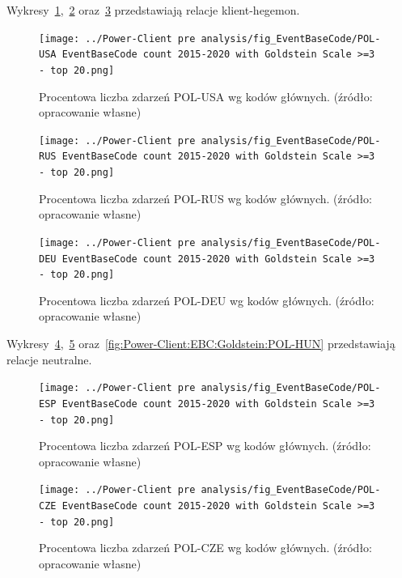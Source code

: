 \documentclass[11pt]{report}
\begin{document}
    Wykresy~\ref{fig:Power-Client:EBC:Goldstein:POL-USA},~\ref{fig:Power-Client:EBC:Goldstein:POL-RUS} oraz~\ref{fig:Power-Client:EBC:Goldstein:POL-DEU} przedstawiają relacje klient-hegemon.
    \begin{figure}[!htp]
        \centering
        \texttt{[image: ../Power-Client pre analysis/fig\_EventBaseCode/POL-USA EventBaseCode count 2015-2020 with Goldstein Scale >=3 - top 20.png]}
        \caption{Procentowa liczba zdarzeń POL-USA wg kodów głównych. (źródło: opracowanie własne)}
        \label{fig:Power-Client:EBC:Goldstein:POL-USA}
    \end{figure}

    \begin{figure}[!htp]
        \centering
        \texttt{[image: ../Power-Client pre analysis/fig\_EventBaseCode/POL-RUS EventBaseCode count 2015-2020 with Goldstein Scale >=3 - top 20.png]}
        \caption{Procentowa liczba zdarzeń POL-RUS wg kodów głównych. (źródło: opracowanie własne)}
        \label{fig:Power-Client:EBC:Goldstein:POL-RUS}
    \end{figure}

    \begin{figure}[!htp]
        \centering
        \texttt{[image: ../Power-Client pre analysis/fig\_EventBaseCode/POL-DEU EventBaseCode count 2015-2020 with Goldstein Scale >=3 - top 20.png]}
        \caption{Procentowa liczba zdarzeń POL-DEU wg kodów głównych. (źródło: opracowanie własne)}
        \label{fig:Power-Client:EBC:Goldstein:POL-DEU}
    \end{figure}

    Wykresy~\ref{fig:Power-Client:EBC:Goldstein:POL-ESP},~\ref{fig:Power-Client:EBC:Goldstein:POL-CZE} oraz~\ref{fig:Power-Client:EBC:Goldstein:POL-HUN} przedstawiają relacje neutralne.
    \begin{figure}[!htp]
        \centering
        \texttt{[image: ../Power-Client pre analysis/fig\_EventBaseCode/POL-ESP EventBaseCode count 2015-2020 with Goldstein Scale >=3 - top 20.png]}
        \caption{Procentowa liczba zdarzeń POL-ESP wg kodów głównych. (źródło: opracowanie własne)}
        \label{fig:Power-Client:EBC:Goldstein:POL-ESP}
    \end{figure}

    \begin{figure}[!htp]
        \centering
        \texttt{[image: ../Power-Client pre analysis/fig\_EventBaseCode/POL-CZE EventBaseCode count 2015-2020 with Goldstein Scale >=3 - top 20.png]}
        \caption{Procentowa liczba zdarzeń POL-CZE wg kodów głównych. (źródło: opracowanie własne)}
        \label{fig:Power-Client:EBC:Goldstein:POL-CZE}
    \end{figure}
\end{document}
